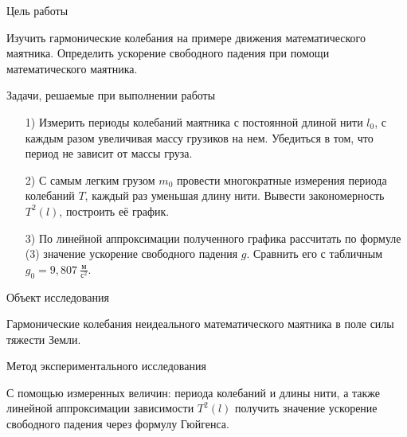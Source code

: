 \documentclass[12pt]{article}
\begin{document}
    \makeheader
    
    \begin{point}{Цель работы}
        \par Изучить гармонические колебания на примере движения математического маятника. Определить ускорение  свободного падения при помощи математического маятника.
    \end{point}
    
    \begin{point}{Задачи, решаемые при выполнении работы}
        \begin{enumerate}
            \item[1)] Измерить периоды колебаний маятника с постоянной длиной нити $l_0$,
                с каждым разом увеличивая массу грузиков на нем. Убедиться в том, что период
                не зависит от массы груза.
            \item[2)] С самым легким грузом $m_0$ провести многократные измерения периода колебаний $T$,
                каждый раз уменьшая длину нити. Вывести закономерность $T^2(l)$, построить её график.
            \item[3)] По линейной аппроксимации полученного графика рассчитать по формуле (3) значение 
                ускорение свободного падения $g$. Сравнить его с табличным $g_{0} = 9,807 \ \frac{\text{м}}{\text{с}^2}$.
        \end{enumerate}
    \end{point}
    
    \begin{point}{Объект исследования}
        \par Гармонические колебания неидеального математического маятника
        в поле силы тяжести Земли.
    \end{point}
    
    \begin{point}{Метод экспериментального исследования}
        \par С помощью измеренных величин: периода колебаний и длины нити,
        а также линейной аппроксимации зависимости $T^2(l)$ получить значение
        ускорение свободного падения через формулу Гюйгенса.
    \end{point}
    
\end{document}

